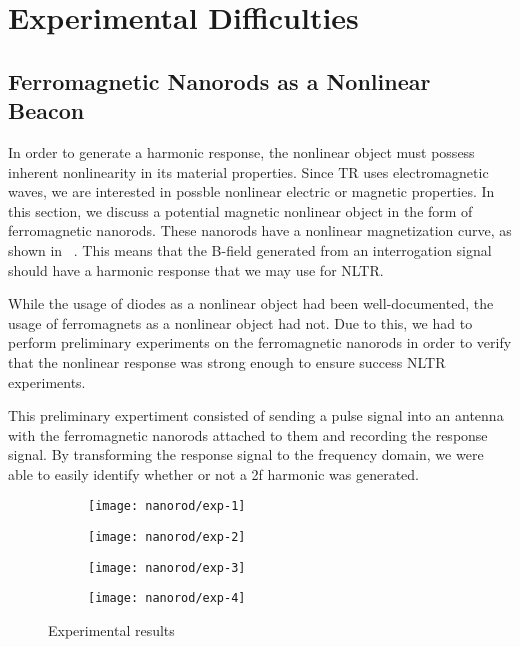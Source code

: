 \section{Experimental Difficulties}
\label{sec:nltr-expr-diff}

\subsection{Ferromagnetic Nanorods as a Nonlinear Beacon}

In order to generate a harmonic response, the nonlinear object must possess inherent nonlinearity in its material properties. Since TR uses electromagnetic waves, we are interested in possble nonlinear electric or magnetic properties. In this section, we discuss a potential magnetic nonlinear object in the form of ferromagnetic nanorods. These nanorods have a nonlinear magnetization curve, as shown in ~. This means that the B-field generated from an interrogation signal should have a harmonic response that we may use for NLTR. 

While the usage of diodes as a nonlinear object had been well-documented, the usage of ferromagnets as a nonlinear object had not. Due to this, we had to perform preliminary experiments on the ferromagnetic nanorods in order to verify that the nonlinear response was strong enough to ensure success NLTR experiments. 

This preliminary expertiment consisted of sending a pulse signal into an antenna with the ferromagnetic nanorods attached to them and recording the response signal. By transforming the response signal to the frequency domain, we were able to easily identify whether or not a 2f harmonic was generated. 
 
 \begin{figure}[h!]
     \centering
     \begin{subfigure}{0.45\textwidth}
         \centering
         \texttt{[image: nanorod/exp-1]}
         \caption[]{}
         \label{fig:nanorod-exp-1}
     \end{subfigure}
         \begin{subfigure}{0.45\textwidth}
         \centering
         \texttt{[image: nanorod/exp-2]}
         \caption[]{}
         \label{fig:nanorod-exp-2}
     \end{subfigure}
         \begin{subfigure}{0.45\textwidth}
         \centering
         \texttt{[image: nanorod/exp-3]}
         \caption[]{}
         \label{fig:nanorod-exp-3}
     \end{subfigure}
         \begin{subfigure}{0.45\textwidth}
         \centering
         \texttt{[image: nanorod/exp-4]}
         \caption[]{}
         \label{fig:nanorod-exp-4}
     \end{subfigure}
     \caption[Ferromagnetic nanorod experimental results]{Experimental results}
     \label{fig:nanorod-results}
 \end{figure}
 
